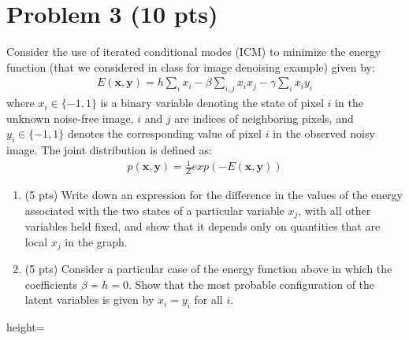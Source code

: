 \section*{Problem 3 (10 pts)}

Consider the use of iterated conditional modes (ICM) to minimize the energy function (that we considered in class for image denoising example) given by:
\begin{align*}
    E(\textbf{x}, \textbf{y}) = h\sum_{i} x_i - \beta\sum_{i,j} x_i x_j - \gamma\sum_{i}x_i y_i
\end{align*}
where $x_i \in \{-1, 1\}$ is a binary variable denoting the state of pixel $i$ in the unknown noise-free image, $i$ and $j$ are indices of neighboring pixels, and $y_i \in \{-1, 1\}$ denotes the corresponding value of pixel $i$ in the observed noisy image.
The joint distribution is defined as:
\begin{align*}
    p(\textbf{x}, \textbf{y}) = \frac{1}{Z} exp(-E(\textbf{x}, \textbf{y}))
\end{align*}

\begin{enumerate}
    \item (5 pts) Write down an expression for the difference in the values of the energy associated with the two states of a particular variable $x_j$, with all other variables held fixed, and show that it depends only on quantities that are local $x_j$ in the graph.
    
    \item (5 pts) Consider a particular case of the energy function above in which the coefficients $\beta = h = 0$.
    Show that the most probable configuration of the latent variables is given by $x_i = y_i$ for all $i$.
\end{enumerate}

\pagebreak

\begin{soln}{height=\textheight}
\end{soln}